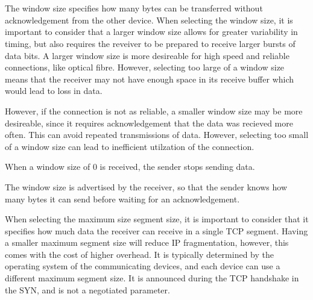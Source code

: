 \section{}
The window size specifies how many bytes can be transferred without
acknowledgement from the other device. 
When selecting the window size, it is important to consider that a larger window
size allows for greater variability in timing, but also requires the reveiver to
be prepared to receive larger bursts of data bits. A larger window size is more
desireable for high speed and reliable connections, like optical fibre. However,
selecting too large of a window size means that the receiver may not have enough
space in its receive buffer which would lead to loss in data. 

However,
if the connection is not as reliable, a smaller window size may be more
desireable, since it requires acknowledgement that the data was recieved more
often. This can avoid repeated transmissions of data. However, selecting too
small of a window size can lead to inefficient utilzation of the connection. 

When a window size of 0 is received, the sender stops sending data. 

The window size is advertised by the receiver, so that the sender knows how many
bytes it can send before waiting for an acknowledgement.

When selecting the maximum size segment size, it is important to consider that
it specifies how much data the receiver can receive in a single TCP segment.
Having a smaller maximum segment size will reduce IP fragmentation, however,
this comes with the cost of higher overhead.
It is typically determined by the operating system of the communicating devices,
and each device can use a different maximum segment size. It is
announced during the TCP handshake in the SYN, and is not a negotiated
parameter. 


